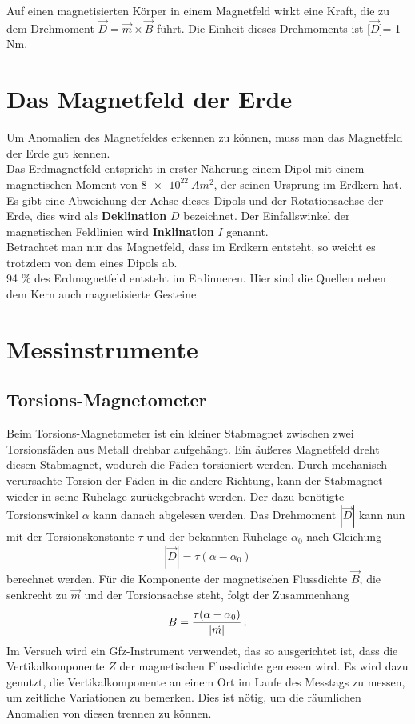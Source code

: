 Auf einen magnetisierten Körper in einem Magnetfeld wirkt eine Kraft, die zu dem Drehmoment $\vec{D} = \vec{m} \times \vec{B}$ führt. Die Einheit dieses Drehmoments ist [$\vec{D}$]= 1 Nm.

\section{Das Magnetfeld der Erde}
Um Anomalien des Magnetfeldes erkennen zu können, muss man das Magnetfeld der Erde gut kennen.\\
Das Erdmagnetfeld entspricht in erster Näherung einem Dipol mit einem magnetischen Moment von $\SI{8 e22}{Am^2}$, der seinen Ursprung im Erdkern hat. Es gibt eine Abweichung der Achse dieses Dipols und der 
Rotationsachse der Erde, dies wird als \textbf{Deklination} $D$ bezeichnet. 
Der Einfallswinkel der magnetischen Feldlinien wird \textbf{Inklination} $I$ genannt. \\
Betrachtet man nur das Magnetfeld, dass im Erdkern entsteht, so weicht es trotzdem von dem eines Dipols ab. \\ 94 \% des Erdmagnetfeld entsteht im Erdinneren. Hier sind die Quellen neben dem Kern auch magnetisierte Gesteine 

\section{Messinstrumente}

\subsection{Torsions-Magnetometer}

Beim Torsions-Magnetometer ist ein kleiner Stabmagnet zwischen zwei Torsionsfäden aus Metall drehbar aufgehängt. Ein äußeres Magnetfeld dreht diesen Stabmagnet, wodurch die Fäden torsioniert werden. Durch mechanisch verursachte Torsion der Fäden in die andere Richtung, kann der Stabmagnet wieder in seine Ruhelage zurückgebracht werden. Der dazu benötigte Torsionswinkel $\alpha$ kann danach abgelesen werden. Das Drehmoment $|\vec{D}|$ kann nun mit der Torsionskonstante $\tau$ und der bekannten Ruhelage $\alpha_0$ nach Gleichung
\begin{equation}
 |\vec{D}|=\tau(\alpha-\alpha_0)
\end{equation}
berechnet werden. Für die Komponente der magnetischen Flussdichte $\vec{B}$, die senkrecht zu $\vec{m}$ und der Torsionsachse steht, folgt der Zusammenhang
\begin{equation}
 B=\frac{\tau(\alpha-\alpha_0)}{|\vec{m}|} \text{\,.}
\end{equation}
Im Versuch wird ein Gfz-Instrument verwendet, das so ausgerichtet ist, dass die Vertikalkomponente $Z$ der magnetischen Flussdichte gemessen wird. Es wird dazu genutzt, die Vertikalkomponente an einem Ort im Laufe des Messtags zu messen, um zeitliche Variationen zu bemerken. Dies ist nötig, um die räumlichen Anomalien von diesen trennen zu können.

